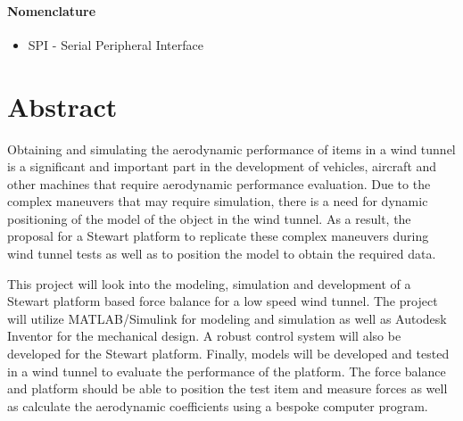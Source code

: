\paragraph{Nomenclature}
\begin{itemize}
\item SPI - Serial Peripheral Interface
\end{itemize}
\pagebreak
{}

\section*{Abstract}
\label{sec:Abstract}
Obtaining and simulating the aerodynamic performance of items in a wind tunnel is a
significant and important part in the development of vehicles, aircraft and other machines
that require aerodynamic performance evaluation. Due to the complex maneuvers that may require simulation, there is a need for dynamic positioning of the model of the object in the wind tunnel. As a result, the proposal for a Stewart platform to replicate these complex maneuvers during wind tunnel tests as well as to position the model to obtain the required data.

This project will look into the modeling, simulation and development of a Stewart
platform based force balance for a low speed wind tunnel. The project will utilize
MATLAB/Simulink for modeling and simulation as well as Autodesk Inventor for the mechanical
design. A robust control system will also be developed for the Stewart platform.
Finally, models will be developed and tested in a wind tunnel to evaluate the performance
of the platform. The force balance and platform should be able to position the test
item and measure forces as well as calculate the aerodynamic coefficients using a bespoke computer program.




